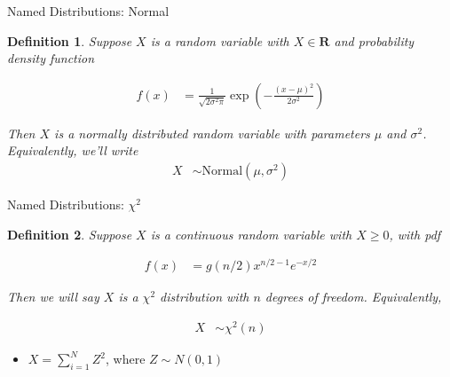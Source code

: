 \documentclass[aspectratio=169, handout]{beamer}
\newtheorem{defn}{Definition}
\numberwithin{equation}{section}
\begin{document}
\begin{frame}{Named Distributions: Normal}

\begin{defn}
Suppose $X$ is a random variable with $X \in \mathbf{R}$ and probability density function

\begin{align*}
f(x) & =  \frac{1}{\sqrt{2\sigma^2\pi}}\exp\left(-\frac{(x - \mu)^2}{2\sigma^2}\right) 
\end{align*}

Then $X$ is a \alert{normally} distributed random variable with parameters $\mu$ and $\sigma^2$.  \\


Equivalently, we'll write 
\begin{align*}
X & \sim  \text{Normal}(\mu, \sigma^2) 
\end{align*}

\end{defn}
\end{frame}



\begin{frame}{Named Distributions: $\chi^{2}$}

\begin{defn}
Suppose $X$ is a continuous random variable with $X\geq 0$, with pdf 

\begin{align*}
f(x) &= g(n/2) x^{n/2 - 1} e^{-x/2} 
\end{align*}

Then we will say $X$ is a $\chi^2$ distribution with $n$ degrees of freedom.  Equivalently,

\begin{align*}
X & \sim  \chi^{2}(n) 
\end{align*}

\end{defn}
\begin{itemize}
\item $X = \sum_{i=1}^{N} Z^2$, where $Z\sim N(0,1)$
\end{itemize}

\end{frame}
\end{document}
